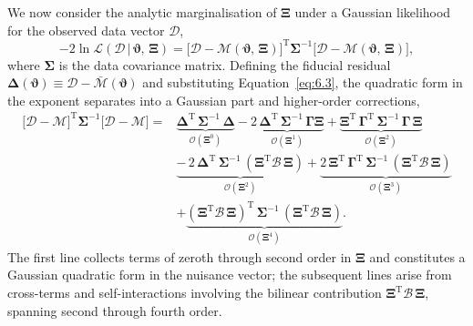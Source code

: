We now consider the analytic marginalisation of \(\boldsymbol{\Xi}\) under a Gaussian likelihood for the observed data vector \(\boldsymbol{\mathcal{D}}\),
\begin{equation} \label{eq:6.4}
    -2\ln\mathcal{L}(\boldsymbol{\mathcal{D}} \,|\, \boldsymbol{\vartheta},\, \boldsymbol{\Xi}) = \bigl[\boldsymbol{\mathcal{D}} - \boldsymbol{\mathcal{M}}(\boldsymbol{\vartheta},\, \boldsymbol{\Xi})\bigr]^{\mathrm{T}} \boldsymbol{\Sigma}^{-1} \bigl[\boldsymbol{\mathcal{D}} - \boldsymbol{\mathcal{M}}(\boldsymbol{\vartheta},\, \boldsymbol{\Xi})\bigr],
\end{equation}
where \(\boldsymbol{\Sigma}\) is the data covariance matrix. Defining the fiducial residual \(\boldsymbol{\Delta}(\boldsymbol{\vartheta}) \equiv \boldsymbol{\mathcal{D}} - \bar{\boldsymbol{\mathcal{M}}}(\boldsymbol{\vartheta})\) and substituting Equation~\ref{eq:6.3}, the quadratic form in the exponent separates into a Gaussian part and higher-order corrections,
\begin{align} \label{eq:6.5}
    \bigl[\boldsymbol{\mathcal{D}} - \boldsymbol{\mathcal{M}}\bigr]^{\mathrm{T}} \boldsymbol{\Sigma}^{-1} \bigl[\boldsymbol{\mathcal{D}} - \boldsymbol{\mathcal{M}}\bigr]
    ={} & \underbrace{\boldsymbol{\Delta}^{\mathrm{T}}\, \boldsymbol{\Sigma}^{-1}\, \boldsymbol{\Delta}}_{\mathcal{O}(\boldsymbol{\Xi}^0)} - \underbrace{2\,\boldsymbol{\Delta}^{\mathrm{T}}\, \boldsymbol{\Sigma}^{-1}\, \boldsymbol{\Gamma}\boldsymbol{\Xi}}_{\mathcal{O}(\boldsymbol{\Xi}^1)} + \underbrace{\boldsymbol{\Xi}^{\mathrm{T}}\, \boldsymbol{\Gamma}^{\mathrm{T}}\, \boldsymbol{\Sigma}^{-1}\, \boldsymbol{\Gamma}\, \boldsymbol{\Xi}}_{\mathcal{O}(\boldsymbol{\Xi}^2)} \nonumber\\[4pt]
    & \underbrace{-\, 2\,\boldsymbol{\Delta}^{\mathrm{T}}\, \boldsymbol{\Sigma}^{-1}\, (\boldsymbol{\Xi}^{\mathrm{T}} \boldsymbol{\mathcal{B}}\, \boldsymbol{\Xi})}_{\mathcal{O}(\boldsymbol{\Xi}^2)} + \underbrace{2\,\boldsymbol{\Xi}^{\mathrm{T}}\, \boldsymbol{\Gamma}^{\mathrm{T}}\, \boldsymbol{\Sigma}^{-1}\, (\boldsymbol{\Xi}^{\mathrm{T}} \boldsymbol{\mathcal{B}}\, \boldsymbol{\Xi})}_{\mathcal{O}(\boldsymbol{\Xi}^3)} \nonumber\\[4pt]
    & + \underbrace{(\boldsymbol{\Xi}^{\mathrm{T}} \boldsymbol{\mathcal{B}}\, \boldsymbol{\Xi})^{\mathrm{T}}\, \boldsymbol{\Sigma}^{-1}\, (\boldsymbol{\Xi}^{\mathrm{T}} \boldsymbol{\mathcal{B}}\, \boldsymbol{\Xi})}_{\mathcal{O}(\boldsymbol{\Xi}^4)}.
\end{align}
The first line collects terms of zeroth through second order in \(\boldsymbol{\Xi}\) and constitutes a Gaussian quadratic form in the nuisance vector; the subsequent lines arise from cross-terms and self-interactions involving the bilinear contribution \(\boldsymbol{\Xi}^{\mathrm{T}} \boldsymbol{\mathcal{B}}\, \boldsymbol{\Xi}\), spanning second through fourth order.

